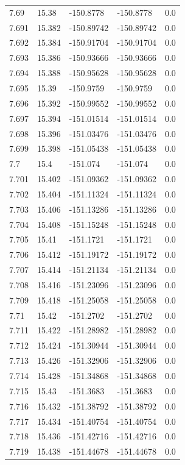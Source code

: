 \begin{tabular}{lllll}
7.69 & 15.38 & -150.8778 & -150.8778 & 0.0 \\
7.691 & 15.382 & -150.89742 & -150.89742 & 0.0 \\
7.692 & 15.384 & -150.91704 & -150.91704 & 0.0 \\
7.693 & 15.386 & -150.93666 & -150.93666 & 0.0 \\
7.694 & 15.388 & -150.95628 & -150.95628 & 0.0 \\
7.695 & 15.39 & -150.9759 & -150.9759 & 0.0 \\
7.696 & 15.392 & -150.99552 & -150.99552 & 0.0 \\
7.697 & 15.394 & -151.01514 & -151.01514 & 0.0 \\
7.698 & 15.396 & -151.03476 & -151.03476 & 0.0 \\
7.699 & 15.398 & -151.05438 & -151.05438 & 0.0 \\
7.7 & 15.4 & -151.074 & -151.074 & 0.0 \\
7.701 & 15.402 & -151.09362 & -151.09362 & 0.0 \\
7.702 & 15.404 & -151.11324 & -151.11324 & 0.0 \\
7.703 & 15.406 & -151.13286 & -151.13286 & 0.0 \\
7.704 & 15.408 & -151.15248 & -151.15248 & 0.0 \\
7.705 & 15.41 & -151.1721 & -151.1721 & 0.0 \\
7.706 & 15.412 & -151.19172 & -151.19172 & 0.0 \\
7.707 & 15.414 & -151.21134 & -151.21134 & 0.0 \\
7.708 & 15.416 & -151.23096 & -151.23096 & 0.0 \\
7.709 & 15.418 & -151.25058 & -151.25058 & 0.0 \\
7.71 & 15.42 & -151.2702 & -151.2702 & 0.0 \\
7.711 & 15.422 & -151.28982 & -151.28982 & 0.0 \\
7.712 & 15.424 & -151.30944 & -151.30944 & 0.0 \\
7.713 & 15.426 & -151.32906 & -151.32906 & 0.0 \\
7.714 & 15.428 & -151.34868 & -151.34868 & 0.0 \\
7.715 & 15.43 & -151.3683 & -151.3683 & 0.0 \\
7.716 & 15.432 & -151.38792 & -151.38792 & 0.0 \\
7.717 & 15.434 & -151.40754 & -151.40754 & 0.0 \\
7.718 & 15.436 & -151.42716 & -151.42716 & 0.0 \\
7.719 & 15.438 & -151.44678 & -151.44678 & 0.0 \\

\end{tabular}

